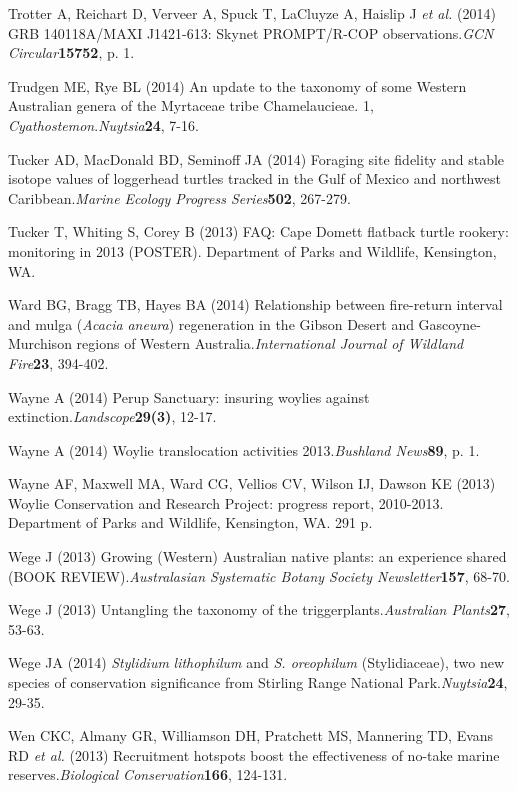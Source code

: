 \documentclass[version=last, paper=a4, DIV=18, usenames, dvipsnames]{scrartcl}
\begin{document}
Trotter A, Reichart D, Verveer A, Spuck T, LaCluyze A, Haislip J \emph{et al.} (2014) GRB 140118A/MAXI J1421-613: Skynet PROMPT/R-COP observations.\emph{GCN Circular}\textbf{15752}, p. 1.


Trudgen ME, Rye BL (2014) An update to the taxonomy of some Western Australian genera of the Myrtaceae tribe Chamelaucieae. 1, \emph{Cyathostemon}.\emph{Nuytsia}\textbf{24}, 7-16.


Tucker AD, MacDonald BD, Seminoff JA (2014) Foraging site fidelity and stable isotope values of loggerhead turtles tracked in the Gulf of Mexico and northwest Caribbean.\emph{Marine Ecology Progress Series}\textbf{502}, 267-279.


Tucker T, Whiting S, Corey B (2013) FAQ: Cape Domett flatback turtle rookery: monitoring in 2013 (POSTER). Department of Parks and Wildlife, Kensington, WA.


Ward BG, Bragg TB, Hayes BA (2014) Relationship between fire-return interval and mulga (\emph{Acacia} \emph{aneura}) regeneration in the Gibson Desert and Gascoyne-Murchison regions of Western Australia.\emph{International Journal of Wildland Fire}\textbf{23}, 394-402.


Wayne A (2014) Perup Sanctuary: insuring woylies against extinction.\emph{Landscope}\textbf{29(3)}, 12-17.


Wayne A (2014) Woylie translocation activities 2013.\emph{Bushland News}\textbf{89}, p. 1.


Wayne AF, Maxwell MA, Ward CG, Vellios CV, Wilson IJ, Dawson KE (2013) Woylie Conservation and Research Project: progress report, 2010-2013. Department of Parks and Wildlife, Kensington, WA. 291 p.


Wege J (2013) Growing (Western) Australian native plants: an experience shared (BOOK REVIEW).\emph{Australasian Systematic Botany Society Newsletter}\textbf{157}, 68-70.


Wege J (2013) Untangling the taxonomy of the triggerplants.\emph{Australian Plants}\textbf{27}, 53-63.


Wege JA (2014) \emph{Stylidium} \emph{lithophilum} and \emph{S. oreophilum} (Stylidiaceae), two new species of conservation significance from Stirling Range National Park.\emph{Nuytsia}\textbf{24}, 29-35.


Wen CKC, Almany GR, Williamson DH, Pratchett MS, Mannering TD, Evans RD \emph{et al.} (2013) Recruitment hotspots boost the effectiveness of no-take marine reserves.\emph{Biological Conservation}\textbf{166}, 124-131.
\end{document}
